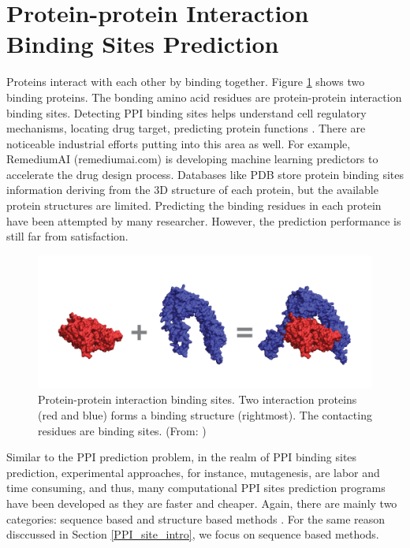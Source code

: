 \section{Protein-protein Interaction Binding Sites Prediction}
Proteins interact with each other by binding together. Figure \ref{fig_ppi_bind} shows two binding proteins. The bonding amino acid residues are protein-protein interaction binding sites. Detecting PPI binding sites helps understand cell regulatory mechanisms, locating drug target, predicting protein functions \cite{bonetta2010interactome}. There are noticeable industrial efforts putting into this area as well. For example, RemediumAI (remediumai.com) is developing machine learning predictors to accelerate the drug design process. Databases like PDB \cite{berman2002protein} store protein binding sites information deriving from the 3D structure of each protein, but the available protein structures are limited. Predicting the binding residues in each protein have been attempted by many researcher. However, the prediction performance is still far from satisfaction. 
\begin{figure}[h!]
\begin{center}
\includegraphics[width=12cm]{img/binding_sites.png}
\end{center}
\caption[Illustration of protein-protein interaction binding sites]{Protein-protein interaction binding sites. Two interaction proteins (red and blue) forms a binding structure (rightmost). The contacting residues are binding sites. (From: \cite{townshend2018generalizable}) \label{fig_ppi_bind}}
\end{figure}

Similar to the PPI prediction problem, in the realm of PPI binding sites prediction, experimental approaches, for instance, mutagenesis, are labor and time consuming, and thus, many computational PPI sites prediction programs have been developed as they are faster and cheaper. Again, there are mainly two categories: sequence based and structure based methods \cite{esmaielbeiki2016progress}. For the same reason disccussed in Section \ref{PPI_site_intro}, we focus on sequence based methods.


